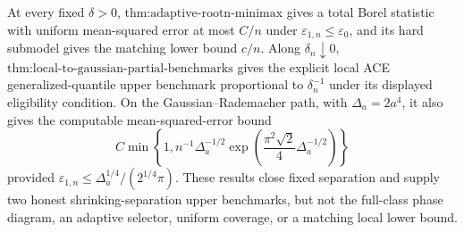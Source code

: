 At every fixed \(\delta>0\),
\(\text{thm:adaptive-rootn-minimax}\) gives a total Borel statistic with
uniform mean-squared error at most \(C/n\) under
\(\varepsilon_{1,n}\le\varepsilon_0\), and its hard submodel gives the
matching lower bound \(c/n\).  Along \(\delta_n\downarrow0\),
\(\text{thm:local-to-gaussian-partial-benchmarks}\) gives the explicit local
ACE generalized-quantile upper benchmark proportional to
\(\delta_n^{-1}\) under its displayed eligibility condition.  On the
Gaussian--Rademacher path, with \(\Delta_a=2a^4\), it also gives the
computable mean-squared-error bound
\[
 C\min\!\left\{1,
 n^{-1}\Delta_a^{-1/2}
 \exp\!\left(\frac{\pi^2\sqrt2}{4}\Delta_a^{-1/2}\right)
 \right\}
\]
provided
\(\varepsilon_{1,n}\le\Delta_a^{1/4}/(2^{1/4}\pi)\).  These results close
fixed separation and supply two honest shrinking-separation upper
benchmarks, but not the full-class phase diagram, an adaptive selector,
uniform coverage, or a matching local lower bound.